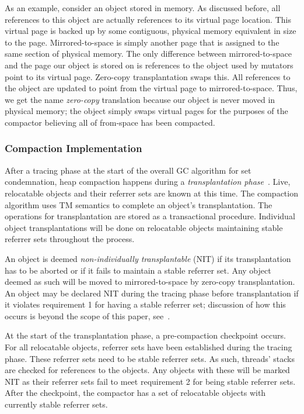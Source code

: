 \documentclass{sig-alternate}
\begin{document}
As an example, consider an object stored in memory. As discussed before, all references
to this object are actually references to its virtual page location. This virtual page
is backed up by some contiguous, physical memory equivalent in size to the page. 
Mirrored-to-space is simply another page that is assigned to the same section of physical memory. 
The only difference between mirrored-to-space and the page our object is stored on
is references to the object used by mutators point to its virtual page.
Zero-copy transplantation swaps this. All references to the object are
updated to point from the virtual page to mirrored-to-space. 
Thus, we get the name \emph{zero-copy} translation
because our object is never moved in physical memory; the object simply
swaps virtual pages for the purposes of the compactor believing all of from-space
has been compacted.


\subsubsection{Compaction Implementation}
\label{sec:collieAlgorithmImplementation}

After a tracing phase at the start of the overall GC algorithm for set condemnation, heap compaction
happens during a \emph{transplantation phase}~\cite{Iyengar:Collie}.
Live, relocatable objects and their referrer sets are known at this time. The compaction 
algorithm uses TM semantics to complete an object's
transplantation. The operations for transplantation are stored as a
transactional procedure. Individual object transplantations will be done on relocatable objects 
maintaining stable referrer sets throughout the process.

An object is deemed \emph{non-individually transplantable} (NIT) if its transplantation
has to be aborted or if it fails to maintain a stable referrer set. 
Any object deemed as such will be moved to mirrored-to-space by zero-copy 
transplantation. An object may be declared NIT during the tracing phase before transplantation
if it violates requirement 1 for having a stable referrer set; discussion
of how this occurs is beyond the scope of this paper, see~\cite{Iyengar:Collie}.

At the start of the transplantation phase, a pre-compaction checkpoint occurs.
For all relocatable objects, referrer sets have been established during the tracing phase.
These referrer sets need to be stable referrer sets. As such, threads' stacks are checked 
for references to the objects. Any objects with these will be 
marked NIT as their referrer sets fail to meet requirement 2 for being stable referrer sets.
After the checkpoint, the compactor has a set of relocatable objects with currently stable referrer sets.
\end{document}
